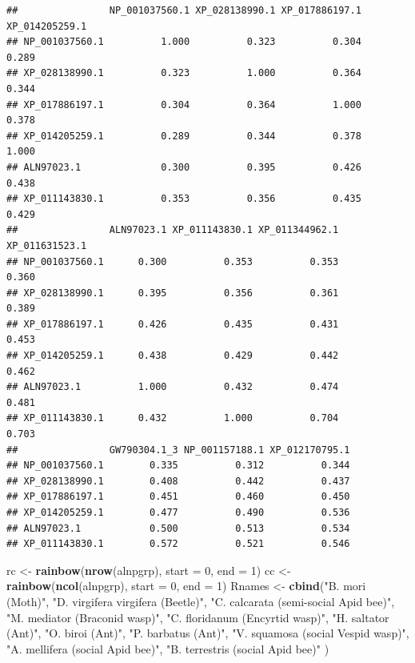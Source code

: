 \documentclass[]{article}
\newenvironment{Shaded}{\begin{snugshade}}{\end{snugshade}}
\newcommand{\KeywordTok}[1]{\textcolor[rgb]{0.13,0.29,0.53}{\textbf{#1}}}
\newcommand{\DataTypeTok}[1]{\textcolor[rgb]{0.13,0.29,0.53}{#1}}
\newcommand{\DecValTok}[1]{\textcolor[rgb]{0.00,0.00,0.81}{#1}}
\newcommand{\StringTok}[1]{\textcolor[rgb]{0.31,0.60,0.02}{#1}}
\newcommand{\NormalTok}[1]{#1}
\begin{document}
\begin{verbatim}
##                NP_001037560.1 XP_028138990.1 XP_017886197.1 XP_014205259.1
## NP_001037560.1          1.000          0.323          0.304          0.289
## XP_028138990.1          0.323          1.000          0.364          0.344
## XP_017886197.1          0.304          0.364          1.000          0.378
## XP_014205259.1          0.289          0.344          0.378          1.000
## ALN97023.1              0.300          0.395          0.426          0.438
## XP_011143830.1          0.353          0.356          0.435          0.429
##                ALN97023.1 XP_011143830.1 XP_011344962.1 XP_011631523.1
## NP_001037560.1      0.300          0.353          0.353          0.360
## XP_028138990.1      0.395          0.356          0.361          0.389
## XP_017886197.1      0.426          0.435          0.431          0.453
## XP_014205259.1      0.438          0.429          0.442          0.462
## ALN97023.1          1.000          0.432          0.474          0.481
## XP_011143830.1      0.432          1.000          0.704          0.703
##                GW790304.1_3 NP_001157188.1 XP_012170795.1
## NP_001037560.1        0.335          0.312          0.344
## XP_028138990.1        0.408          0.442          0.437
## XP_017886197.1        0.451          0.460          0.450
## XP_014205259.1        0.477          0.490          0.536
## ALN97023.1            0.500          0.513          0.534
## XP_011143830.1        0.572          0.521          0.546
\end{verbatim}

\begin{Shaded}
\begin{Highlighting}[]
\NormalTok{rc <-}\StringTok{ }\KeywordTok{rainbow}\NormalTok{(}\KeywordTok{nrow}\NormalTok{(alnpgrp), }\DataTypeTok{start =} \DecValTok{0}\NormalTok{, }\DataTypeTok{end =} \DecValTok{1}\NormalTok{)}
\NormalTok{cc <-}\StringTok{ }\KeywordTok{rainbow}\NormalTok{(}\KeywordTok{ncol}\NormalTok{(alnpgrp), }\DataTypeTok{start =} \DecValTok{0}\NormalTok{, }\DataTypeTok{end =} \DecValTok{1}\NormalTok{)}
\NormalTok{Rnames <-}\StringTok{ }\KeywordTok{cbind}\NormalTok{(}\StringTok{"B. mori (Moth)"}\NormalTok{,}
                \StringTok{"D. virgifera virgifera (Beetle)"}\NormalTok{,}
                \StringTok{"C. calcarata (semi-social Apid bee)"}\NormalTok{,}
                \StringTok{"M. mediator (Braconid wasp)"}\NormalTok{, }
                \StringTok{"C. floridanum (Encyrtid wasp)"}\NormalTok{,}
                \StringTok{"H. saltator (Ant)"}\NormalTok{, }
                \StringTok{"O. biroi (Ant)"}\NormalTok{,}
                \StringTok{"P. barbatus (Ant)"}\NormalTok{,}
                \StringTok{"V. squamosa (social Vespid wasp)"}\NormalTok{,}
                \StringTok{"A. mellifera (social Apid bee)"}\NormalTok{, }
                \StringTok{"B. terrestris (social Apid bee)"} 
\NormalTok{                )}
\end{Highlighting}
\end{Shaded}
\end{document}
